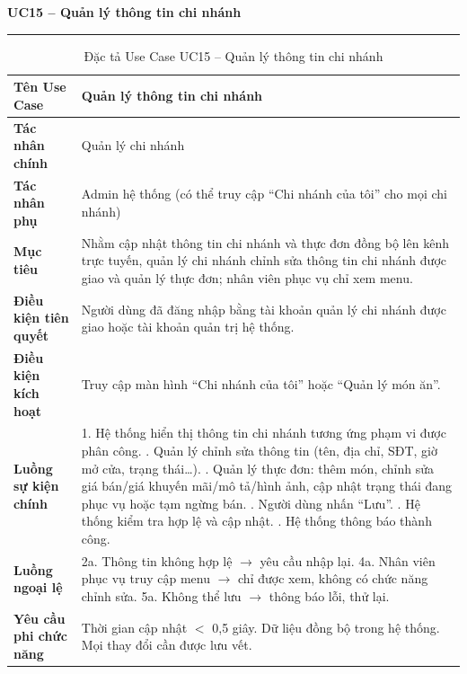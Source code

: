 ﻿\documentclass[../DoAn.tex]{subfiles}
\newcommand{\UCtitle}[1]{%
    \vspace{0.5em}
    {\large\bfseries #1}\\[-0.5em]
    \rule{\textwidth}{0.5pt}
    \vspace{0.3em}
}
\begin{document}
\begin{table}[H]
\UCtitle{UC15 – Quản lý thông tin chi nhánh}
\centering
\begin{tabular}{|p{4cm}|p{10.2cm}|}
\hline
\textbf{Tên Use Case} & Quản lý thông tin chi nhánh \\ \hline
\textbf{Tác nhân chính} & Quản lý chi nhánh \\ \hline
\textbf{Tác nhân phụ} & Admin hệ thống (có thể truy cập ``Chi nhánh của tôi'' cho mọi chi nhánh) \\ \hline
\textbf{Mục tiêu} &
Nhằm cập nhật thông tin chi nhánh và thực đơn đồng bộ lên kênh trực tuyến, quản lý chi nhánh chỉnh sửa thông tin chi nhánh được giao và quản lý thực đơn; nhân viên phục vụ chỉ xem menu.
\\ \hline
\textbf{Điều kiện tiên quyết} &
Người dùng đã đăng nhập bằng tài khoản quản lý chi nhánh được giao hoặc tài khoản quản trị hệ thống.
\\ \hline
\textbf{Điều kiện kích hoạt} &
Truy cập màn hình ``Chi nhánh của tôi'' hoặc ``Quản lý món ăn''.
\\ \hline
\textbf{Luồng sự kiện chính} &
1. Hệ thống hiển thị thông tin chi nhánh tương ứng phạm vi được phân công. \newline
2. Quản lý chỉnh sửa thông tin (tên, địa chỉ, SĐT, giờ mở cửa, trạng thái\ldots). \newline
3. Quản lý thực đơn: thêm món, chỉnh sửa giá bán/giá khuyến mãi/mô tả/hình ảnh, cập nhật trạng thái đang phục vụ hoặc tạm ngừng bán. \newline
4. Người dùng nhấn ``Lưu''. \newline
5. Hệ thống kiểm tra hợp lệ và cập nhật. \newline
6. Hệ thống thông báo thành công.
\\ \hline
\textbf{Luồng ngoại lệ} &
2a. Thông tin không hợp lệ $\rightarrow$ yêu cầu nhập lại. \newline
4a. Nhân viên phục vụ truy cập menu $\rightarrow$ chỉ được xem, không có chức năng chỉnh sửa. \newline
5a. Không thể lưu $\rightarrow$ thông báo lỗi, thử lại.
\\ \hline
\textbf{Yêu cầu phi chức năng} &
Thời gian cập nhật $<$ 0,5 giây. Dữ liệu đồng bộ trong hệ thống. Mọi thay đổi cần được lưu vết.
\\ \hline
\end{tabular}
\caption{Đặc tả Use Case UC15 – Quản lý thông tin chi nhánh}
\end{table}
\end{document}
